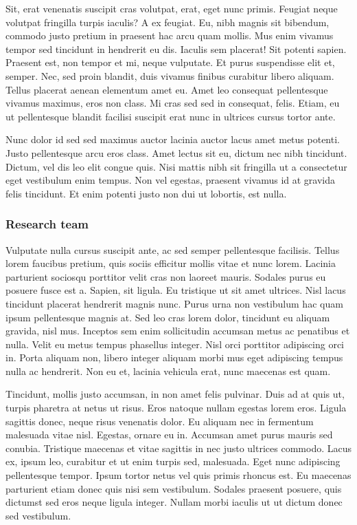 \documentclass[11pt,]{article}
\begin{document}
Sit, erat venenatis suscipit cras volutpat, erat, eget nunc primis.
Feugiat neque volutpat fringilla turpis iaculis? A ex feugiat. Eu, nibh
magnis sit bibendum, commodo justo pretium in praesent hac arcu quam
mollis. Mus enim vivamus tempor sed tincidunt in hendrerit eu dis.
Iaculis sem placerat! Sit potenti sapien. Praesent est, non tempor et
mi, neque vulputate. Et purus suspendisse elit et, semper. Nec, sed
proin blandit, duis vivamus finibus curabitur libero aliquam. Tellus
placerat aenean elementum amet eu. Amet leo consequat pellentesque
vivamus maximus, eros non class. Mi cras sed sed in consequat, felis.
Etiam, eu ut pellentesque blandit facilisi suscipit erat nunc in
ultrices cursus tortor ante.

Nunc dolor id sed sed maximus auctor lacinia auctor lacus amet metus
potenti. Justo pellentesque arcu eros class. Amet lectus sit eu, dictum
nec nibh tincidunt. Dictum, vel dis leo elit congue quis. Nisi mattis
nibh sit fringilla ut a consectetur eget vestibulum enim tempus. Non vel
egestas, praesent vivamus id at gravida felis tincidunt. Et enim potenti
justo non dui ut lobortis, est nulla.

\hypertarget{research-team}{%
\subsubsection{Research team}\label{research-team}}

Vulputate nulla cursus suscipit ante, ac sed semper pellentesque
facilisis. Tellus lorem faucibus pretium, quis sociis efficitur mollis
vitae et nunc lorem. Lacinia parturient sociosqu porttitor velit cras
non laoreet mauris. Sodales purus eu posuere fusce est a. Sapien, sit
ligula. Eu tristique ut sit amet ultrices. Nisl lacus tincidunt placerat
hendrerit magnis nunc. Purus urna non vestibulum hac quam ipsum
pellentesque magnis at. Sed leo cras lorem dolor, tincidunt eu aliquam
gravida, nisl mus. Inceptos sem enim sollicitudin accumsan metus ac
penatibus et nulla. Velit eu metus tempus phasellus integer. Nisl orci
porttitor adipiscing orci in. Porta aliquam non, libero integer aliquam
morbi mus eget adipiscing tempus nulla ac hendrerit. Non eu et, lacinia
vehicula erat, nunc maecenas est quam.

Tincidunt, mollis justo accumsan, in non amet felis pulvinar. Duis ad at
quis ut, turpis pharetra at netus ut risus. Eros natoque nullam egestas
lorem eros. Ligula sagittis donec, neque risus venenatis dolor. Eu
aliquam nec in fermentum malesuada vitae nisl. Egestas, ornare eu in.
Accumsan amet purus mauris sed conubia. Tristique maecenas et vitae
sagittis in nec justo ultrices commodo. Lacus ex, ipsum leo, curabitur
et ut enim turpis sed, malesuada. Eget nunc adipiscing pellentesque
tempor. Ipsum tortor netus vel quis primis rhoncus est. Eu maecenas
parturient etiam donec quis nisi sem vestibulum. Sodales praesent
posuere, quis dictumst sed eros neque ligula integer. Nullam morbi
iaculis ut ut dictum donec sed vestibulum.
\end{document}
